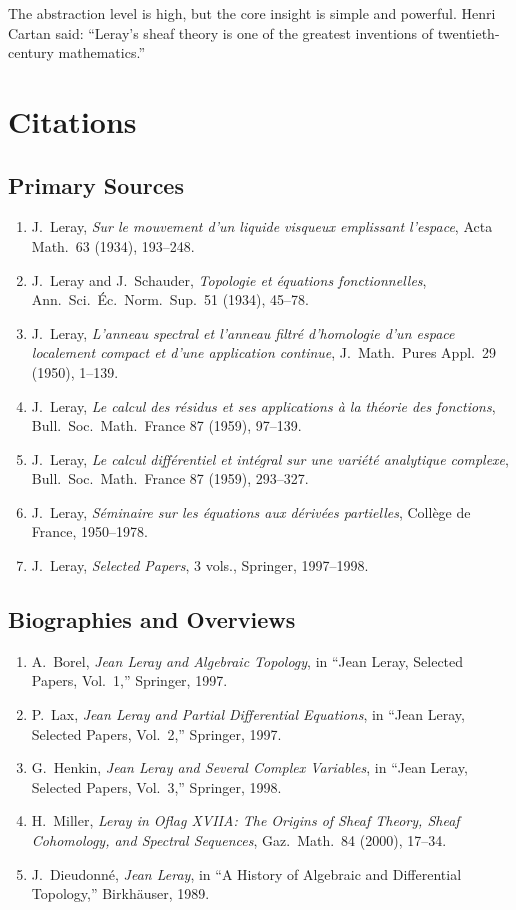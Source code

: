 The abstraction level is high, but the core insight is simple and powerful. Henri Cartan said: ``Leray's sheaf theory is one of the greatest inventions of twentieth-century mathematics.''

\section{Citations}\subsection*{Primary Sources}
\begin{enumerate}
    \item J.\ Leray, \textit{Sur le mouvement d'un liquide visqueux emplissant l'espace}, Acta Math.\ 63 (1934), 193--248.
    \item J.\ Leray and J.\ Schauder, \textit{Topologie et {\'e}quations fonctionnelles}, Ann.\ Sci.\ {\'E}c.\ Norm.\ Sup.\ 51 (1934), 45--78.
    \item J.\ Leray, \textit{L'anneau spectral et l'anneau filtr{\'e} d'homologie d'un espace localement compact et d'une application continue}, J.\ Math.\ Pures Appl.\ 29 (1950), 1--139.
    \item J.\ Leray, \textit{Le calcul des r{\'e}sidus et ses applications {\`a} la th{\'e}orie des fonctions}, Bull.\ Soc.\ Math.\ France 87 (1959), 97--139.
    \item J.\ Leray, \textit{Le calcul diff{\'e}rentiel et int{\'e}gral sur une vari{\'e}t{\'e} analytique complexe}, Bull.\ Soc.\ Math.\ France 87 (1959), 293--327.
    \item J.\ Leray, \textit{S{\'e}minaire sur les {\'e}quations aux d{\'e}riv{\'e}es partielles}, Coll{\`e}ge de France, 1950--1978.
    \item J.\ Leray, \textit{Selected Papers}, 3 vols., Springer, 1997--1998.
\end{enumerate}

\subsection*{Biographies and Overviews}
\begin{enumerate}
    \item A.\ Borel, \textit{Jean Leray and Algebraic Topology}, in ``Jean Leray, Selected Papers, Vol.\ 1,'' Springer, 1997.
    \item P.\ Lax, \textit{Jean Leray and Partial Differential Equations}, in ``Jean Leray, Selected Papers, Vol.\ 2,'' Springer, 1997.
    \item G.\ Henkin, \textit{Jean Leray and Several Complex Variables}, in ``Jean Leray, Selected Papers, Vol.\ 3,'' Springer, 1998.
    \item H.\ Miller, \textit{Leray in Oflag XVIIA: The Origins of Sheaf Theory, Sheaf Cohomology, and Spectral Sequences}, Gaz.\ Math.\ 84 (2000), 17--34.
    \item J.\ Dieudonn{\'e}, \textit{Jean Leray}, in ``A History of Algebraic and Differential Topology,'' Birkh\"{a}user, 1989.
\end{enumerate}

